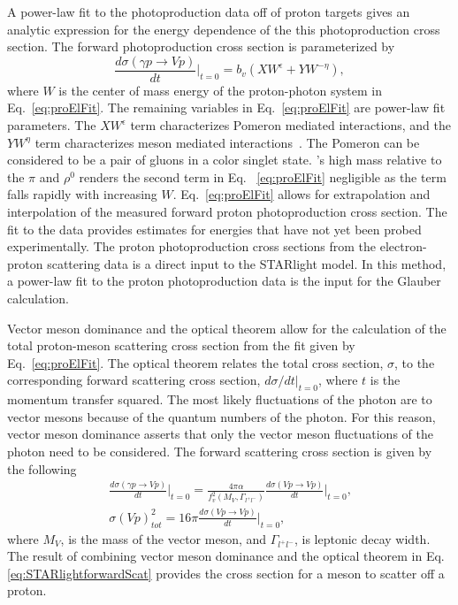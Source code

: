     A power-law fit to the photoproduction data off of proton targets gives an 
      analytic expression for the energy dependence of the this photoproduction 
      cross section.
    The forward photoproduction cross section is parameterized by
    \begin{equation} \label{eq:proElFit}
      \frac{d\sigma(\gamma p\rightarrow Vp)}{dt}\Big|_{t=0}
        =b_{v}(XW^{\epsilon}+YW^{-\eta}),
    \end{equation}
    where $W$ is the center of mass energy of the proton-photon system in 
      Eq.~\ref{eq:proElFit}.
    The remaining variables in Eq.~\ref{eq:proElFit} are power-law fit 
      parameters.  
    The $XW^{\epsilon}$ term characterizes Pomeron\cite{Donnachie:2002en} 
      mediated interactions, and the $YW^{\eta}$ term characterizes meson 
      mediated interactions~\cite{vmd1999}.
    The Pomeron can be considered to be a pair of gluons in a color singlet 
      state.
    \JPsi{}'s high mass relative to the $\pi$ and $\rho^{0}$ renders the second 
      term in Eq. ~\ref{eq:proElFit} negligible as the term falls rapidly with
      increasing $W$.
    Eq.~\ref{eq:proElFit} allows for extrapolation and interpolation of the 
      measured forward proton photoproduction cross section. 
    The fit to the data provides estimates for energies that have not yet been 
      probed experimentally.
    The proton photoproduction cross sections from the electron-proton 
      scattering data is a direct input to the STARlight model. 
    In this method, a power-law fit to the proton photoproduction data is the 
      input for the Glauber calculation. 

    Vector meson dominance and the optical theorem allow for the calculation of 
      the total proton-meson scattering cross section from the fit given by 
      Eq.~\ref{eq:proElFit}. 
    The optical theorem relates the total cross section, $\sigma$, 
      to the corresponding forward scattering cross section, 
      $d\sigma/dt|_{t=0}$, where $t$ is the momentum transfer squared.
    The most likely fluctuations of the photon are to vector mesons because of 
      the quantum numbers of the photon.
    For this reason, vector meson dominance asserts that only the 
      vector meson fluctuations of the photon need to be considered. 
    The forward scattering cross section is given by the following
    \begin{eqnarray} \label{eq:STARlightforwardScat}
      \frac{d\sigma(\gamma p\rightarrow Vp)}{dt}\Big|_{t=0}=
      \frac{4\pi \alpha}{f^{2}_{v}(M_{V},\Gamma_{l^{+}l^{-}})}\frac{d\sigma(Vp\rightarrow Vp)}{dt}
        \Big|_{t=0} \textrm{,} \nonumber \\
      \sigma(Vp)_{tot}^{2}=16\pi\frac{d\sigma(Vp\rightarrow Vp)}{dt}\Big|_{t=0} \textrm{,}
    \end{eqnarray}
      where $M_{V}$, is the mass of the vector meson, and $\Gamma_{l^{+}l^{-}}$, 
      is leptonic decay width. 
    The result of combining vector meson dominance and the optical theorem 
      in Eq.\ref{eq:STARlightforwardScat} provides the cross section for a meson to 
      scatter off a proton.

